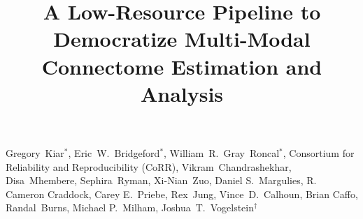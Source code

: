 \documentclass[11pt]{article}
\title{
A Low-Resource Pipeline to Democratize Multi-Modal Connectome Estimation and Analysis
}
\begin{document}
\maketitle
\noindent\parbox{0.9\textwidth}{
\normalsize\color{lgray} Gregory~Kiar$^*$, Eric~W.~Bridgeford$^*$,  William~R.~Gray~Roncal$^*$, 
Consortium for Reliability and Reproducibility (CoRR), 
Vikram~Chandrashekhar, Disa~Mhembere,  Sephira~Ryman,  Xi-Nian~Zuo,  Daniel S.~Margulies, R. Cameron Craddock, Carey E.~Priebe,
Rex~Jung, Vince~D.~Calhoun, 
Brian Caffo, Randal~Burns, Michael P.~Milham,  
Joshua~T.~Vogelstein$^\dagger$
\\%
}
\thispagestyle{empty}
\medskip
\vspace{10pt}
\end{document}
